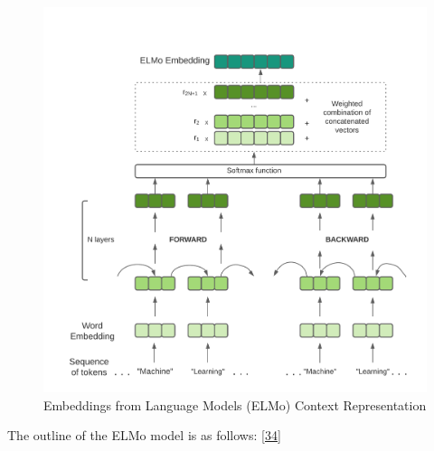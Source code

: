 \begin{figure}[H]
\centering
\includegraphics[scale=0.15]{images/Elmo2.png}
\caption{Embeddings from Language Models (ELMo) Context Representation}
\end{figure}


The outline of the ELMo model is as follows: \hyperlink{34}{[34]}

